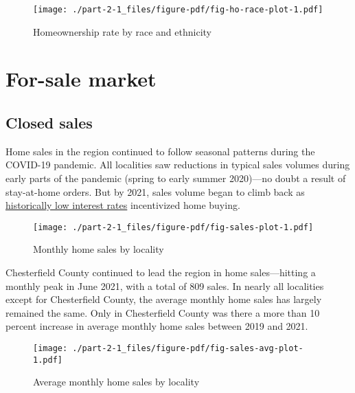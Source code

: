 \documentclass[
  letterpaper,
  DIV=11,
  numbers=noendperiod]{scrreprt}
\begin{document}
\begin{figure}

{\centering \texttt{[image: ./part-2-1\_files/figure-pdf/fig-ho-race-plot-1.pdf]}

}

\caption{\label{fig-ho-race-plot}Homeownership rate by race and
ethnicity}

\end{figure}

\hypertarget{for-sale-market}{%
\section{For-sale market}\label{for-sale-market}}

\hypertarget{closed-sales}{%
\subsection{Closed sales}\label{closed-sales}}

Home sales in the region continued to follow seasonal patterns during
the COVID-19 pandemic. All localities saw reductions in typical sales
volumes during early parts of the pandemic (spring to early summer
2020)---no doubt a result of stay-at-home orders. But by 2021, sales
volume began to climb back as
\href{https://www.marketwatch.com/story/mortgage-rates-drop-to-new-record-low-as-coronavirus-cases-climb-11605802099}{historically
low interest rates} incentivized home buying.

\begin{figure}

{\centering \texttt{[image: ./part-2-1\_files/figure-pdf/fig-sales-plot-1.pdf]}

}

\caption{\label{fig-sales-plot}Monthly home sales by locality}

\end{figure}

Chesterfield County continued to lead the region in home sales---hitting
a monthly peak in June 2021, with a total of 809 sales. In nearly all
localities except for Chesterfield County, the average monthly home
sales has largely remained the same. Only in Chesterfield County was
there a more than 10 percent increase in average monthly home sales
between 2019 and 2021.

\begin{figure}

{\centering \texttt{[image: ./part-2-1\_files/figure-pdf/fig-sales-avg-plot-1.pdf]}

}

\caption{\label{fig-sales-avg-plot}Average monthly home sales by
locality}

\end{figure}
\end{document}
